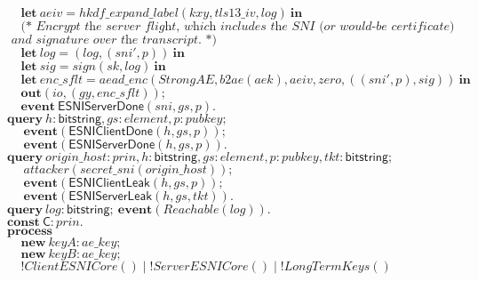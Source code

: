 \documentclass{article}
\newcommand{\kwl}[1]{\mathbf{#1}}
\newcommand{\kwc}[1]{\mathsf{#1}}
\newcommand{\kwt}[1]{\mathsf{#1}}
\newcommand{\kwe}[1]{\mathsf{#1}}
\newcommand{\var}[1]{\mathit{#1}}
\theoremstyle{definition}
\begin{document}
\begin{tabbing}
$\ \ \ \ \ \kwl{let}\ \var{aeiv} = \var{hkdf{\_}expand{\_}label}(\var{kxy}, \var{tls13{\_}iv}, \var{log})\ \kwl{in} $\\
$ $\\
$\ \ \ \ \ \textit{(* Encrypt the server flight, which includes the SNI (or would-be certificate) }$\\
$\textit{        and signature over the transcript. *)} $\\
$\ \ \ \ \ \kwl{let}\ \var{log} = (\var{log}, (\var{sni'}, \var{p}))\ \kwl{in} $\\
$\ \ \ \ \ \kwl{let}\ \var{sig} = \var{sign}(\var{sk}, \var{log})\ \kwl{in} $\\
$\ \ \ \ \ \kwl{let}\ \var{enc{\_}sflt} = \var{aead{\_}enc}(\var{StrongAE}, \var{b2ae}(\var{aek}), \var{aeiv}, \var{zero}, ((\var{sni'}, \var{p}), \var{sig}))\ \kwl{in} $\\
$\ \ \ \ \ \kwl{out}(\var{io}, (\var{gy}, \var{enc{\_}sflt})); $\\
$\ \ \ \ \ \kwl{event}\ \kwe{ESNIServerDone}(\var{sni}, \var{gs}, \var{p}). $\\
$ $\\
$\kwl{query}\ \var{h}{:}\kwt{bitstring}, \var{gs}{:}\var{element}, \var{p}{:}\var{pubkey}; $\\
$\ \ \ \ \ \ \kwl{event}(\kwe{ESNIClientDone}(\var{h}, \var{gs}, \var{p})); $\\
$\ \ \ \ \ \ \kwl{event}(\kwe{ESNIServerDone}(\var{h}, \var{gs}, \var{p})). $\\
$ $\\
$\kwl{query}\ \var{origin{\_}host}{:}\var{prin}, \var{h}{:}\kwt{bitstring}, \var{gs}{:}\var{element}, \var{p}{:}\var{pubkey}, \var{tkt}{:}\kwt{bitstring}; $\\
$\ \ \ \ \ \ \var{attacker}(\var{secret{\_}sni}(\var{origin{\_}host})); $\\
$\ \ \ \ \ \ \kwl{event}(\kwe{ESNIClientLeak}(\var{h}, \var{gs}, \var{p})); $\\
$\ \ \ \ \ \ \kwl{event}(\kwe{ESNIServerLeak}(\var{h}, \var{gs}, \var{tkt})). $\\
$ $\\
$\kwl{query}\ \var{log}{:}\kwt{bitstring};\ \kwl{event}(\var{Reachable}(\var{log})). $\\
$ $\\
$\kwl{const}\ \kwc{C}{:}\var{prin}. $\\
$\kwl{process} $\\
$\ \ \ \ \ \kwl{new}\ \var{keyA}{:}\var{ae{\_}key}; $\\
$\ \ \ \ \ \kwl{new}\ \var{keyB}{:}\var{ae{\_}key}; $\\
$\ \ \ \ \ !\var{ClientESNICore}()\mid!\var{ServerESNICore}()\mid!\var{LongTermKeys}() $\\
$$
\end{tabbing}
\end{document}
